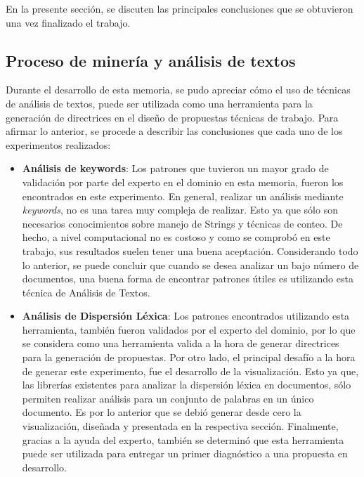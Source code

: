 
    En la presente sección, se discuten las principales conclusiones que se obtuvieron una vez finalizado el trabajo.
    
\subsection{Proceso de minería y análisis de textos}
    Durante el desarrollo de esta memoria, se pudo apreciar cómo el uso de técnicas de análisis de textos, puede ser utilizada como una herramienta para la generación de directrices en el diseño de propuestas técnicas de trabajo. Para afirmar lo anterior, se procede a describir las conclusiones que cada uno de los experimentos realizados:
    
    \begin{itemize}
        \item \textbf{Análisis de keywords}: Los patrones que tuvieron un mayor grado de validación por parte del experto en el dominio en esta memoria, fueron los encontrados en este experimento. En general, realizar un análisis mediante \textit{keywords}, no es una tarea muy compleja de realizar. Esto ya que sólo son necesarios conocimientos sobre manejo de Strings y técnicas de conteo. De hecho, a nivel computacional no es costoso y como se comprobó en este trabajo, sus resultados suelen tener una buena aceptación.  Considerando todo lo anterior, se puede concluir que cuando se desea analizar un bajo número de documentos, una buena forma de encontrar patrones útiles es utilizando esta técnica de Análisis de Textos. 
        \item \textbf{Análisis de Dispersión Léxica}: Los patrones encontrados utilizando esta herramienta, también fueron validados por el experto del dominio, por lo que se considera como una herramienta valida a la hora de generar directrices para la generación de propuestas. Por otro lado, el principal desafío a la hora de generar este experimento, fue el desarrollo de la visualización. Esto ya que, las librerías existentes para analizar la dispersión léxica en documentos, sólo permiten realizar análisis para un conjunto de palabras en un único documento. Es por lo anterior que se debió generar desde cero la visualización, diseñada y presentada en la respectiva sección. Finalmente, gracias a la ayuda del experto, también se determinó que esta herramienta puede ser utilizada para entregar un primer diagnóstico a una propuesta en desarrollo.
        

\end{itemize}
